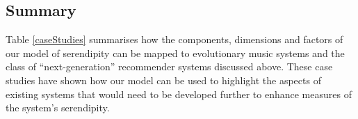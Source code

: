 \subsection{Summary}

Table \ref{caseStudies} summarises how the components, dimensions and
factors of our model of serendipity can be mapped to evolutionary
music systems and the class of ``next-generation'' recommender systems
discussed above.  These case studies have shown how our model can be
used to highlight the aspects of existing systems that would need to
be developed further to enhance measures of the system's serendipity.







